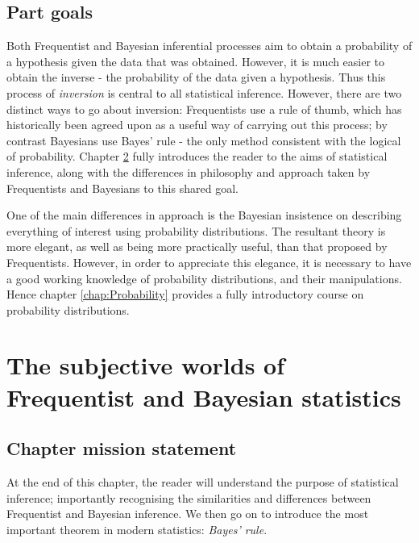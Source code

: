 \documentclass[11pt,fullpage]{book}
\begin{document}
\section{Part goals}
Both Frequentist and Bayesian inferential processes aim to obtain a probability of a hypothesis given the data that was obtained. However, it is much easier to obtain the inverse - the probability of the data given a hypothesis. Thus this process of \textit{inversion} is central to all statistical inference. However, there are two distinct ways to go about inversion: Frequentists use a rule of thumb, which has historically been agreed upon as a useful way of carrying out this process; by contrast Bayesians use Bayes' rule - the only method consistent with the logical of probability. Chapter \ref{chap:subjectiveFrequentistBayes} fully introduces the reader to the aims of statistical inference, along with the differences in philosophy and approach taken by Frequentists and Bayesians to this shared goal. 

One of the main differences in approach is the Bayesian insistence on describing everything of interest using probability distributions. The resultant theory is more elegant, as well as being more practically useful, than that proposed by Frequentists. However, in order to appreciate this elegance, it is necessary to have a good working knowledge of probability distributions, and their manipulations. Hence chapter \ref{chap:Probability} provides a fully introductory course on probability distributions. 

\chapter{The subjective worlds of Frequentist and Bayesian statistics}\label{chap:subjectiveFrequentistBayes}
\section{Chapter mission statement}
At the end of this chapter, the reader will understand the purpose of statistical inference; importantly recognising the similarities and differences between Frequentist and Bayesian inference. We then go on to introduce the most important theorem in modern statistics: \textit{Bayes' rule}.
 
\end{document}
